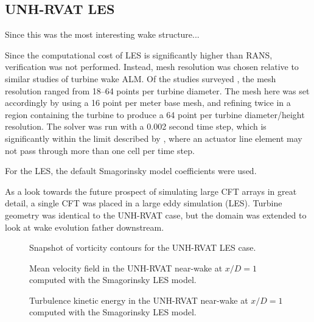 \subsection{UNH-RVAT LES}

Since this was the most interesting wake structure...

Since the computational cost of LES is significantly higher than RANS,
verification was not performed. Instead, mesh resolution was chosen relative to
similar studies of turbine wake ALM. Of the studies surveyed
\cite{Shamsoddin2014,Archer2013,Martinez-Tossas2015a,Troldborg2007}, the mesh
resolution ranged from 18--64 points per turbine diameter. The mesh here was set
accordingly by using a 16 point per meter base mesh, and refining twice in a
region containing the turbine to produce a 64 point per turbine diameter/height
resolution. The solver was run with a 0.002 second time step, which is
significantly within the limit described by \cite{Martinez-Tossas2015}, where an
actuator line element may not pass through more than one cell per time step.

For the LES, the default Smagorinsky model coefficients were used. 

As a look towards the future prospect of simulating large CFT arrays in great
detail, a single CFT was placed in a large eddy simulation (LES). Turbine
geometry was identical to the UNH-RVAT case, but the domain was extended to look
at wake evolution father downstream.


\begin{figure}
    \caption{Snapshot of vorticity contours for the UNH-RVAT LES case.}
    
    \label{RVAT-ALM-LES-vorticity}
\end{figure}

\begin{figure}
    \centering
    
    \caption{Mean velocity field in the UNH-RVAT near-wake at $x/D=1$ computed
        with the Smagorinsky LES model.}
    
    \label{fig:RVAT-ALM-LES-meancontquiv}
\end{figure}

\begin{figure}
    \centering
    
    \caption{Turbulence kinetic energy in the UNH-RVAT near-wake at $x/D=1$
        computed with the Smagorinsky LES model.}
    
    \label{fig:RVAT-ALM-LES-kcont}
\end{figure}

